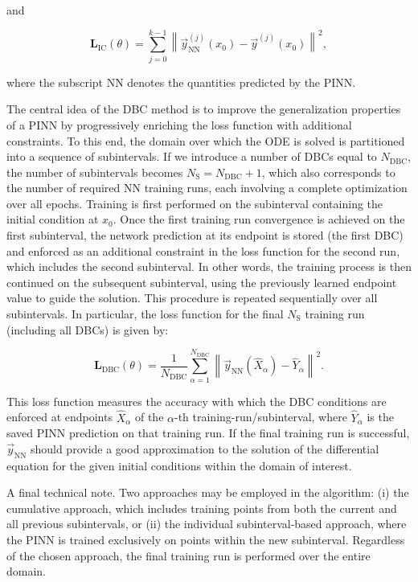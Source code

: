and

\begin{equation}\label{eq:dbc_5}
\mathbf{L}_{\mathrm{IC}}(\theta)=\sum_{j=0}^{k-1}\left\|\vec{y}_{\mathrm{NN}}^{(j)}(x_0)-\vec{y}^{(j)}(x_0)\right\|^2,
\end{equation}

where the subscript NN denotes the quantities predicted by the PINN.

The central idea of the DBC method is to improve the generalization properties of a PINN by progressively enriching the loss function with additional constraints. To this end, the domain over which the ODE is solved is partitioned into a sequence of subintervals. If we introduce a number of DBCs equal to $N_{\mathrm{DBC}}$, the number of subintervals becomes $N_{\mathrm{S}} = N_{\mathrm{DBC}} + 1$, which also corresponds to the number of required NN training runs, each involving a complete optimization over all epochs. Training is first performed on the subinterval containing the initial condition at $x_0$. Once the first training run convergence is achieved on the first subinterval, the network prediction at its endpoint is stored (the first DBC) and enforced as an additional constraint in the loss function for the second run, which includes the second subinterval. In other words, the training process is then continued on the subsequent subinterval, using the previously learned endpoint value to guide the solution. This procedure is repeated sequentially over all subintervals. In particular, the loss function for the final $N_{\mathrm{S}}$ training run (including all DBCs) is given by:

\begin{equation}\label{eq:dbc_6}
\mathbf{L}_{\mathrm{DBC}}(\theta)=\frac{1}{N_{\mathrm{DBC}}}\sum_{\alpha=1}^{N_{\mathrm{DBC}}}\left\|\vec{y}_{\mathrm{NN}}(\hat{X}_\alpha)-\hat{Y}_\alpha\right\|^2.
\end{equation}

This loss function measures the accuracy with which the DBC conditions are enforced at endpoints $\hat{X}_\alpha$ of the $\alpha$-th training-run/subinterval, where $\hat{Y}_\alpha$ is the saved PINN prediction on that training run. If the final training run is successful, $\vec{y}_{\mathrm{NN}}$ should provide a good approximation to the solution of the differential equation for the given initial conditions within the domain of interest.

A final technical note. Two approaches may be employed in the algorithm: (i) the cumulative approach, which includes training points from both the current and all previous subintervals, or (ii) the individual subinterval-based approach, where the PINN is trained exclusively on points within the new subinterval. Regardless of the chosen approach, the final training run is performed over the entire domain.

